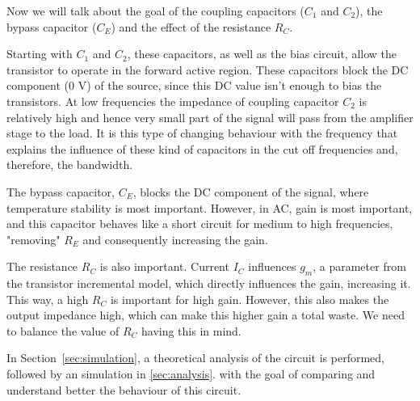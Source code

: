Now we will talk about the goal of the coupling capacitors ($C_{1}$ and $C_{2}$), the bypass capacitor ($C_{E}$) and the effect of the resistance $R_{C}$.

Starting with $C_{1}$ and $C_{2}$, these capacitors, as well as the bias circuit, allow the transistor to operate in the forward active region. 
These capacitors block the DC component (0 V) of the source, since this DC value isn't enough to bias the transistors.
At low frequencies the impedance of coupling capacitor $C_{2}$ is relatively high and hence very small part of the signal will pass from the
amplifier stage to the load.
It is this type of changing behaviour with the frequency that explains the influence of these kind of capacitors in the cut off frequencies and, 
therefore, the bandwidth.

The bypass capacitor, $C_{E}$, blocks the DC component of the signal, where temperature stability is most important. However, in AC,
gain is most important, and this capacitor behaves like a short circuit for medium to high frequencies,
"removing" $R_{E}$ and consequently increasing the gain. 

The resistance $R_{C}$ is also important. Current $I_{C}$ influences $g_{m}$, a parameter from the transistor incremental model,
which directly influences the gain, increasing it. This way, a high $R_{C}$ is important for high gain. However, this also 
makes the output impedance high, which can make this higher gain a total waste. We need to balance the value of $R_{C}$ having this in mind.  


In Section~\ref{sec:simulation}, a theoretical analysis of the circuit is performed, followed by an simulation in \ref{sec:analysis}.
with the goal of comparing and understand better the behaviour of this circuit.







